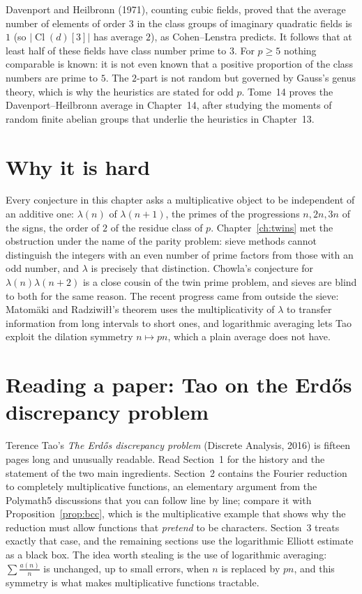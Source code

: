 \begin{remark}\label{rem:clknown}
Davenport and Heilbronn (1971), counting cubic fields, proved that the average number of elements of order $3$ in the class groups of imaginary quadratic
fields is $1$ (so $|\operatorname{Cl}(d)[3]|$ has average $2$), as Cohen--Lenstra predicts. It follows that at least half of these fields have class number prime to $3$. For
$p\ge5$ nothing comparable is known: it is not even known that a positive proportion of the class numbers are prime to $5$. The $2$-part is not random but governed by Gauss's genus
theory, which is why the heuristics are stated for odd $p$. Tome~14 proves the Davenport--Heilbronn average in Chapter~14, after studying the moments of
random finite abelian groups that underlie the heuristics in Chapter~13.
\end{remark}

\section{Why it is hard}

Every conjecture in this chapter asks a multiplicative object to be independent of an additive one: $\lambda(n)$ of $\lambda(n+1)$, the primes of the
progressions $n,2n,3n$ of the signs, the order of $2$ of the residue class of $p$. Chapter~\ref{ch:twins} met the obstruction under the name of the parity
problem: sieve methods cannot distinguish the integers with an even number of prime factors from those with an odd number, and $\lambda$ is precisely that
distinction. Chowla's conjecture for $\lambda(n)\lambda(n+2)$ is a close cousin of the twin prime problem, and sieves are blind to both for the same reason. The recent progress came from
outside the sieve: Matom\"aki and Radziwi\l\l's theorem uses the multiplicativity of $\lambda$ to transfer information from long intervals to short ones, and
logarithmic averaging lets Tao exploit the dilation symmetry $n\mapsto pn$, which a plain average does not have.

\section{Reading a paper: Tao on the Erd\H os discrepancy problem}

Terence Tao's \emph{The Erd\H os discrepancy problem} (Discrete Analysis, 2016) is fifteen pages long and unusually readable. Read Section~1 for the history and
the statement of the two main ingredients. Section~2 contains the Fourier reduction to completely multiplicative functions, an elementary argument from the
Polymath5 discussions that you can follow line by line; compare it with Proposition~\ref{prop:bcc}, which is the multiplicative example that shows why the
reduction must allow functions that \emph{pretend} to be characters. Section~3 treats exactly that case, and the remaining sections use the logarithmic
Elliott estimate as a black box. The idea worth stealing is the use of logarithmic averaging: $\sum\frac{a(n)}n$ is unchanged, up to small errors, when $n$ is
replaced by $pn$, and this symmetry is what makes multiplicative functions tractable.

